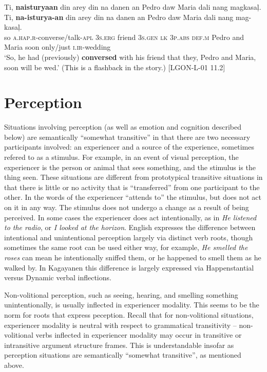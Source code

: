 \z
\ea
Ti,  \textbf{naisturyaan}  din  arey  din  na  danen  an Pedro  daw  Maria   dali  nang  magkasaļ. \\\smallskip
\gll Ti,  \textbf{na-isturya-an}  din  arey  din  na  danen  an Pedro  daw  Maria   dali  nang  mag-kasaļ. \\
so  \textsc{a.hap.r}-converse/talk-\textsc{apl}  3\textsc{s.erg}  friend  3\textsc{s.gen}  \textsc{lk}  3\textsc{p.abs}  \textsc{def.m} Pedro  and  Maria  soon  only/just  \textsc{i.ir}-wedding \\
\glt `So, he had (previously) \textbf{conversed} with his friend that they, Pedro and Maria, soon will be wed.’ (This is a flashback in the story.) [LGON-L-01 11.2]
\z
\section{Perception}
\label{sec:perception}

Situations involving perception (as well as emotion and cognition described below) are semantically “somewhat transitive” in that there are two necessary participants involved: an experiencer and a source of the experience, sometimes refered to as a stimulus. For example, in an event of visual perception, the experiencer is the person or animal that sees something, and the stimulus is the thing seen. These situations are different from prototypical transitive situations in that there is little or no activity that is “transferred” from one participant to the other. In the words of \citet[164]{croft2001} the experiencer “attends to” the stimulus, but does not act on it in any way. The stimulus does not undergo a change as a result of being perceived. In some cases the experiencer does act intentionally, as in \textit{He listened to the radio}, or \textit{I looked at the horizon}. English expresses the difference between intentional and unintentional perception largely via distinct verb roots, though sometimes the same root can be used either way, for example, \textit{He smelled the roses} can mean he intentionally sniffed them, or he happened to smell them as he walked by. In Kagayanen this difference is largely expressed via Happenstantial versus Dynamic verbal inflections.

Non-volitional perception, such as seeing, hearing, and smelling something unintentionally, is usually inflected in experiencer modality. This seems to be the norm for roots that express peception. Recall that for non-volitional situations, experiencer modality is neutral with respect to grammatical transitivity – non-volitional verbs inflected in experiencer modality may occur in transitive or intransitive argument structure frames. This is understandable insofar as perception situations are semantically “somewhat transitive”, as mentioned above.

